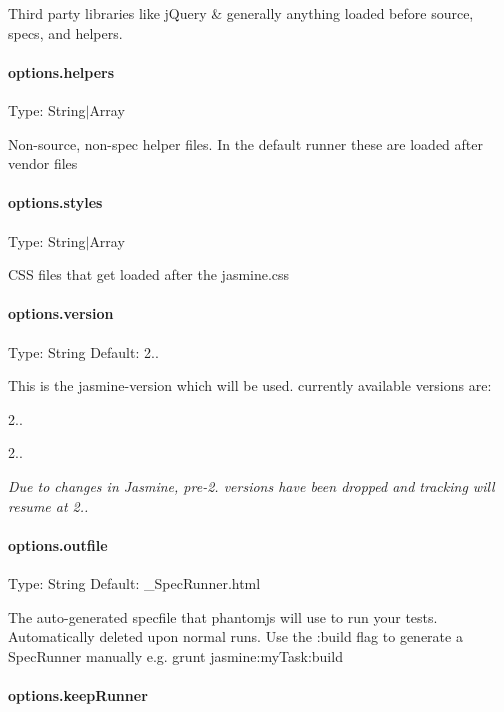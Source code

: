 Third party libraries like j\+Query \& generally anything loaded before source, specs, and helpers.

\paragraph*{options.\+helpers}

Type\+: {\ttfamily String$\vert$\+Array}

Non-\/source, non-\/spec helper files. In the default runner these are loaded after {\ttfamily vendor} files

\paragraph*{options.\+styles}

Type\+: {\ttfamily String$\vert$\+Array}

C\+S\+S files that get loaded after the jasmine.\+css

\paragraph*{options.\+version}

Type\+: {\ttfamily String} Default\+: \textquotesingle{}2..\textquotesingle{}

This is the jasmine-\/version which will be used. currently available versions are\+:


\begin{DoxyItemize}
\item 2..
\item 2..
\end{DoxyItemize}

{\itshape Due to changes in Jasmine, pre-\/2. versions have been dropped and tracking will resume at 2..}

\paragraph*{options.\+outfile}

Type\+: {\ttfamily String} Default\+: {\ttfamily \+\_\+\+Spec\+Runner.\+html}

The auto-\/generated specfile that phantomjs will use to run your tests. Automatically deleted upon normal runs. Use the {\ttfamily \+:build} flag to generate a Spec\+Runner manually e.\+g. {\ttfamily grunt jasmine\+:my\+Task\+:build}

\paragraph*{options.\+keep\+Runner}

